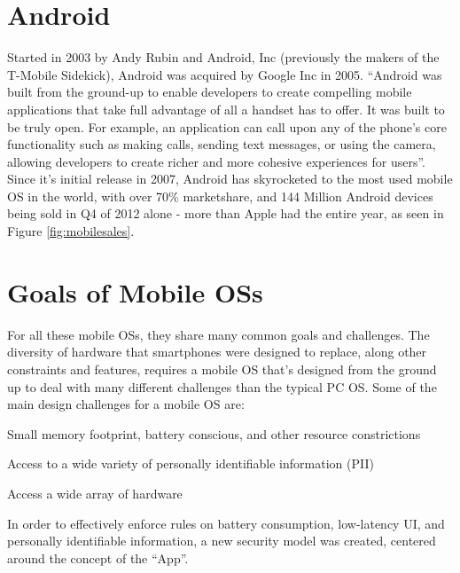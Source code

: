 \section{Android}
Started in 2003 by Andy Rubin and Android, Inc (previously the makers of the T-Mobile Sidekick), Android was acquired by Google Inc in 2005\citep{businessweek2005}. ``Android was built from the ground-up to enable developers to create compelling mobile applications that take full advantage of all a handset has to offer. It was built to be truly open. For example, an application can call upon any of the phone’s core functionality such as making calls, sending text messages, or using the camera, allowing developers to create richer and more cohesive experiences for users''\citep{ohaandroidoverview}. Since it's initial release in 2007\citep{oharelease2007}, Android has skyrocketed to the most used mobile OS in the world, with over 70\% marketshare, and 144 Million Android devices being sold in Q4 of 2012 alone\citep{gartnerq42012} - more than Apple had the entire year, as seen in Figure \ref{fig:mobilesales}.



\section{Goals of Mobile OSs}
For all these mobile OSs, they share many common goals and challenges. The diversity of hardware that smartphones were designed to replace, along other constraints and features, requires a mobile OS that's designed from the ground up to deal with many different challenges than the typical PC OS. Some of the main design challenges for a mobile OS are: 
\begin{smitemize}

\item Small memory footprint, battery conscious, and other resource constrictions

\item Access to a wide variety of personally identifiable information (PII)

\item Access a wide array of hardware

\end{smitemize}
In order to effectively enforce rules on battery consumption, low-latency UI, and personally identifiable information, a new security model was created, centered around the concept of the ``App''. 


